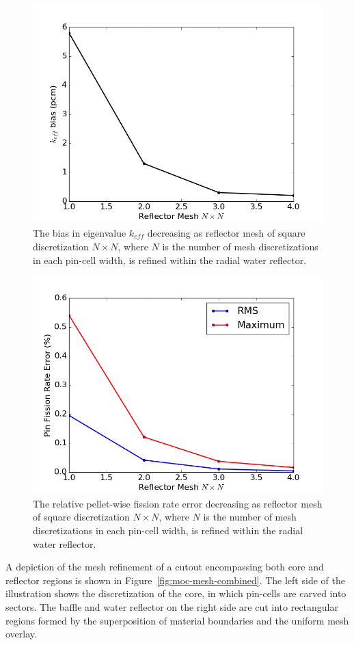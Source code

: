 \begin{figure}[h!]
	\centering
	\includegraphics[width=0.7\linewidth]{figures/results/sensitivity/reflector_mesh_pcm.png}
	\caption[]{The bias in eigenvalue $k_{\textit{eff}}$ decreasing as reflector mesh of square discretization $N \times N$, where $N$ is the number of mesh discretizations in each pin-cell width, is refined within the radial water reflector.}
	\label{fig:rad-ref-pcm}
\end{figure}
\begin{figure}[h!]
	\centering
	\includegraphics[width=0.7\linewidth]{figures/results/sensitivity/reflector_mesh_fr.png}
	\caption[]{The relative pellet-wise fission rate error decreasing as reflector mesh of square discretization $N \times N$, where $N$ is the number of mesh discretizations in each pin-cell width, is refined within the radial water reflector.}
	\label{fig:rad-ref-fr}
\end{figure}

A depiction of the mesh refinement of a cutout encompassing both core and reflector regions is shown in Figure~\ref{fig:moc-mesh-combined}. The left side of the illustration shows the discretization of the core, in which pin-cells are carved into sectors. The baffle and water reflector on the right side are cut into rectangular regions formed by the superposition of material boundaries and the uniform mesh overlay.

